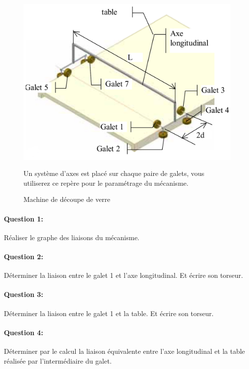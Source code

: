 \begin{figure}[htbp]
\begin{minipage}[c]{.48\linewidth}
\begin{center}
\includegraphics[width=0.8\linewidth]{img/Table1.png}
\caption{Machine de découpe de verre}
\label{fig:image2}
\end{center}

Un système d'axes est placé sur chaque paire de galets, vous utiliserez ce repère pour le paramétrage du mécanisme.
\end{minipage}
\end{figure}

\paragraph{Question 1:}

Réaliser le graphe des liaisons du mécanisme.

\paragraph{Question 2:}

Déterminer la liaison entre le galet 1 et l'axe longitudinal. Et écrire son torseur.

\paragraph{Question 3:}

Déterminer la liaison entre le galet 1 et la table. Et écrire son torseur.

\paragraph{Question 4:}

Déterminer par le calcul la liaison équivalente entre l'axe longitudinal et la table réalisée par l'intermédiaire du galet.

